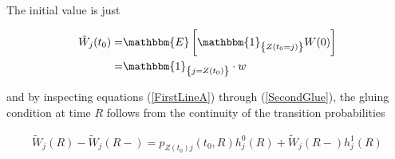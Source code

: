 \documentclass{article}
\newcommand{\1}[1]{\mathbbm{1}_{\left\lbrace #1 \right\rbrace}}
\newcommand{\expec}[1][def]{\mathbbm{E} \left[ #1 \right]}
\theoremstyle{break}
\theoremstyle{remark}
\numberwithin{equation}{section}
\begin{document}
\begin{appendices}
The initial value is just

\begin{align*}
	\tilde{W}_j(t_0) =& \expec[\1{Z(t_0=j)} W(0)] \\
	=& \1{j=Z(t_0)} \cdot w
\end{align*}

and by inspecting equations (\ref{FirstLineA}) through (\ref{SecondGlue}), the gluing condition at time $R$ follows from the continuity of the transition probabilities

\begin{align*}
	\tilde{W}_j(R) - \tilde{W}_j(R-) = p_{Z(t_0)j}(t_0,R) h_j^0(R) + \tilde{W}_j(R-) h_j^1(R)
\end{align*}

\end{appendices}

\newpage



\end{document}
